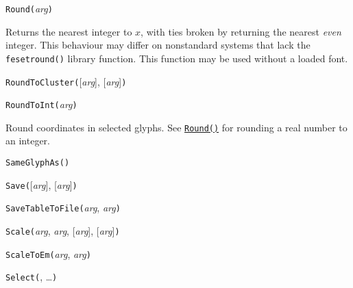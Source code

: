
\texttt{Round(}\textit{arg}\texttt{)}

Returns the nearest integer to $x$, with ties broken by returning the
nearest \emph{even} integer.  This behaviour may differ on nonstandard
systems that lack the \texttt{fesetround()} library function.
This function may be used without a loaded font.



\texttt{RoundToCluster(}[\textit{arg}], [\textit{arg}]\texttt{)}



\texttt{RoundToInt(}\textit{arg}\texttt{)}

Round coordinates in selected glyphs.  See
\hyperref[func:Round]{\texttt{Round()}} for rounding a
real number to an integer.



\texttt{SameGlyphAs(}\texttt{)}



\texttt{Save(}[\textit{arg}], [\textit{arg}]\texttt{)}



\texttt{SaveTableToFile(}\textit{arg}, \textit{arg}\texttt{)}



\texttt{Scale(}\textit{arg}, \textit{arg}, [\textit{arg}], [\textit{arg}]\texttt{)}



\texttt{ScaleToEm(}\textit{arg}, \textit{arg}\texttt{)}



\texttt{Select(}, \ldots\texttt{)}



